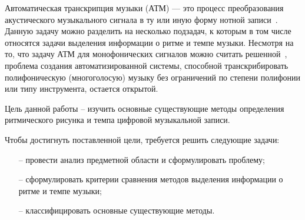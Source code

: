 
Автоматическая транскрипция музыки (АТМ) — это процесс преобразования акустического музыкального сигнала в ту или иную форму нотной записи~\cite{future_dir}. Данную задачу можно разделить на несколько подзадач, к которым в том числе относятся задачи выделения информации о ритме и темпе музыки. Несмотря на то, что задачу АТМ для монофонических сигналов можно считать решенной~\cite{future_dir}, проблема создания автоматизированной системы, способной транскрибировать полифоническую (многоголосую) музыку без ограничений по степени полифонии или типу инструмента, остается открытой.

Цель данной работы – изучить основные существующие методы определения ритмического рисунка и темпа цифровой музыкальной записи.

Чтобы достигнуть поставленной цели, требуется решить следующие задачи:
\begin{itemize}
	\item[--] провести анализ предметной области и сформулировать проблему;
	\item[--] сформулировать критерии сравнения методов выделения информации о ритме и темпе музыки;
	\item[--] классифицировать основные существующие методы.
\end{itemize}